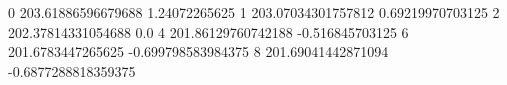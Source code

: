 0 203.61886596679688 1.24072265625
1 203.07034301757812 0.69219970703125
2 202.37814331054688 0.0
4 201.86129760742188 -0.516845703125
6 201.6783447265625 -0.699798583984375
8 201.69041442871094 -0.6877288818359375
